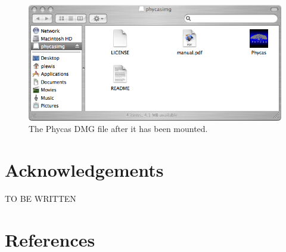 \documentclass[10pt]{article}
\begin{document}
%
%
\begin{figure}[t]
\begin{center}
\begin{minipage}{5.in}
\hfil\includegraphics[scale=0.5]{images/phycasdmg}\hfil
\caption{\small The Phycas DMG file after it has been mounted.}
\label{phycasdmg}
\end{minipage}
\end{center}
\end{figure}

\section*{Acknowledgements}

TO BE WRITTEN

\section*{References}
\renewcommand{\bibsection}{}


\printindex
\end{document}
